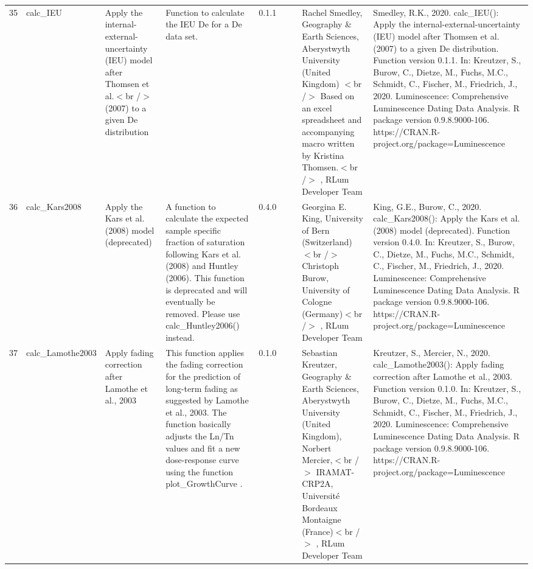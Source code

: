 \begin{table}[ht]
\begin{tabular}{rllllllll}
 \\ 
  35 & calc\_IEU & Apply the internal-external-uncertainty (IEU) model after Thomsen et al.$<$br /$>$ (2007) to a given De distribution & Function to calculate the IEU De for a De data set. & 0.1.1
 &  &  & Rachel Smedley, Geography \& Earth Sciences, Aberystwyth University (United Kingdom)  $<$br /$>$ Based on an excel spreadsheet and accompanying macro written by Kristina Thomsen.$<$br /$>$ , RLum Developer Team & Smedley, R.K., 2020. calc\_IEU(): Apply the internal-external-uncertainty (IEU) model after Thomsen et al. (2007) to a given De distribution. Function version 0.1.1. In: Kreutzer, S., Burow, C., Dietze, M., Fuchs, M.C., Schmidt, C., Fischer, M., Friedrich, J., 2020. Luminescence: Comprehensive Luminescence Dating Data Analysis. R package version 0.9.8.9000-106. https://CRAN.R-project.org/package=Luminescence
 \\ 
  36 & calc\_Kars2008 & Apply the Kars et al. (2008) model (deprecated) & A function to calculate the expected sample specific fraction of saturation following Kars et al. (2008) and Huntley (2006). This function is deprecated and will eventually be removed. Please use  calc\_Huntley2006()  instead. & 0.4.0
 &  &  & Georgina E. King, University of Bern (Switzerland)  $<$br /$>$ Christoph Burow, University of Cologne (Germany)$<$br /$>$ , RLum Developer Team & King, G.E., Burow, C., 2020. calc\_Kars2008(): Apply the Kars et al. (2008) model (deprecated). Function version 0.4.0. In: Kreutzer, S., Burow, C., Dietze, M., Fuchs, M.C., Schmidt, C., Fischer, M., Friedrich, J., 2020. Luminescence: Comprehensive Luminescence Dating Data Analysis. R package version 0.9.8.9000-106. https://CRAN.R-project.org/package=Luminescence
 \\ 
  37 & calc\_Lamothe2003 & Apply fading correction after Lamothe et al., 2003 & This function applies the fading correction for the prediction of long-term fading as suggested by Lamothe et al., 2003. The function basically adjusts the Ln/Tn values and fit a new dose-response curve using the function  plot\_GrowthCurve . & 0.1.0
 &  &  & Sebastian Kreutzer, Geography \& Earth Sciences, Aberystwyth University (United Kingdom), Norbert Mercier,$<$br /$>$ IRAMAT-CRP2A, Université Bordeaux Montaigne (France)$<$br /$>$ , RLum Developer Team & Kreutzer, S., Mercier, N., 2020. calc\_Lamothe2003(): Apply fading correction after Lamothe et al., 2003. Function version 0.1.0. In: Kreutzer, S., Burow, C., Dietze, M., Fuchs, M.C., Schmidt, C., Fischer, M., Friedrich, J., 2020. Luminescence: Comprehensive Luminescence Dating Data Analysis. R package version 0.9.8.9000-106. https://CRAN.R-project.org/package=Luminescence

\end{tabular}
\end{table}
